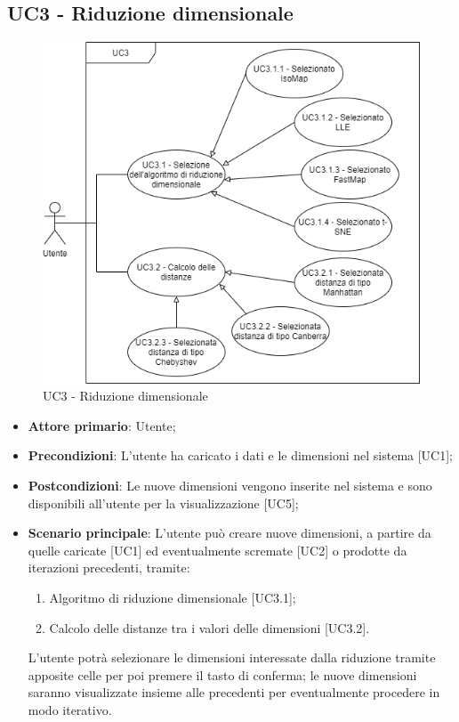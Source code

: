 \subsection{UC3 - Riduzione dimensionale}
\begin{figure}[h]
\includegraphics[width=14cm]{section/Images/UC3.png}
\centering
\caption{UC3 - Riduzione dimensionale}
\end{figure}
\begin{itemize}
	\item \textbf{Attore primario}: Utente;
	\item \textbf{Precondizioni}: L'utente ha caricato i dati e le dimensioni nel sistema [UC1];
	\item \textbf{Postcondizioni}: Le nuove dimensioni vengono inserite nel sistema e sono disponibili all'utente per la visualizzazione [UC5];
	\item \textbf{Scenario principale}: L'utente può creare nuove dimensioni, a partire da quelle caricate [UC1] ed eventualmente scremate [UC2] o prodotte da iterazioni precedenti, tramite:
	\begin{enumerate}[1.]
		\item Algoritmo di riduzione dimensionale [UC3.1];
		\item Calcolo delle distanze tra i valori delle dimensioni [UC3.2].
	\end{enumerate}
	L'utente potrà selezionare le dimensioni interessate dalla riduzione tramite apposite celle per poi premere il tasto di conferma; le nuove dimensioni saranno visualizzate insieme alle precedenti per eventualmente procedere in modo iterativo.
\end{itemize}